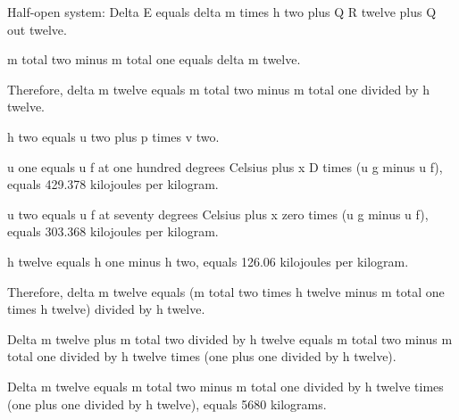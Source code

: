 Half-open system:  
Delta E equals delta m times h two plus Q R twelve plus Q out twelve.  

m total two minus m total one equals delta m twelve.  

Therefore, delta m twelve equals m total two minus m total one divided by h twelve.  

h two equals u two plus p times v two.  

u one equals u f at one hundred degrees Celsius plus x D times (u g minus u f), equals 429.378 kilojoules per kilogram.  

u two equals u f at seventy degrees Celsius plus x zero times (u g minus u f), equals 303.368 kilojoules per kilogram.  

h twelve equals h one minus h two, equals 126.06 kilojoules per kilogram.  

Therefore, delta m twelve equals (m total two times h twelve minus m total one times h twelve) divided by h twelve.  

Delta m twelve plus m total two divided by h twelve equals m total two minus m total one divided by h twelve times (one plus one divided by h twelve).  

Delta m twelve equals m total two minus m total one divided by h twelve times (one plus one divided by h twelve), equals 5680 kilograms.